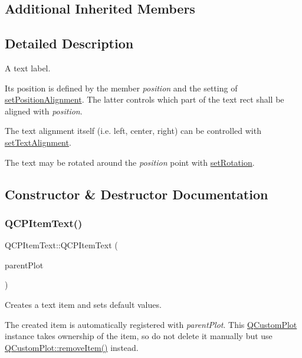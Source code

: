 \subsection*{Additional Inherited Members}


\subsection{Detailed Description}
A text label. 

 Its position is defined by the member {\itshape position} and the setting of \hyperlink{classQCPItemText_a781cdf8c640fc6a055dcff1e675c8c7a}{set\+Position\+Alignment}. The latter controls which part of the text rect shall be aligned with {\itshape position}.

The text alignment itself (i.\+e. left, center, right) can be controlled with \hyperlink{classQCPItemText_ab5bc0684c4d1bed81949a11b34dba478}{set\+Text\+Alignment}.

The text may be rotated around the {\itshape position} point with \hyperlink{classQCPItemText_a4bcc10cd97952c3f749d75824b5077f0}{set\+Rotation}. 

\subsection{Constructor \& Destructor Documentation}
\mbox{\label{classQCPItemText_a77ff96a2972a00872ff8f8c67143abbe}} 
\subsubsection{\texorpdfstring{Q\+C\+P\+Item\+Text()}{QCPItemText()}}
{\footnotesize\ttfamily Q\+C\+P\+Item\+Text\+::\+Q\+C\+P\+Item\+Text (\begin{DoxyParamCaption}\item[{\hyperlink{classQCustomPlot}{Q\+Custom\+Plot} $\ast$}]{parent\+Plot }\end{DoxyParamCaption})\hspace{0.3cm}{\ttfamily [explicit]}}

Creates a text item and sets default values.

The created item is automatically registered with {\itshape parent\+Plot}. This \hyperlink{classQCustomPlot}{Q\+Custom\+Plot} instance takes ownership of the item, so do not delete it manually but use \hyperlink{classQCustomPlot_ae04446557292551e8fb6e2c106e1848d}{Q\+Custom\+Plot\+::remove\+Item()} instead. 

